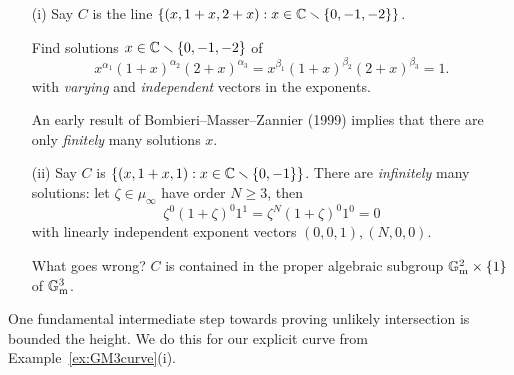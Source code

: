 \begin{example}\label{ex:GM3curve}
  \begin{enumerate}
  \item [(i)]
    Say $C$ is the line $\left\{(x,1+x,2+x) : x\in {\mathbb{C}}\smallsetminus\{0,-1,-2\}\right\}$.
    
    Find solutions  $x\in{\mathbb{C}}\smallsetminus\{0,-1,-2\}$ of 
    \begin{equation*}
      x^{\alpha_1} (1+x)^{\alpha_2} (2+x)^{\alpha_3} =
      x^{\beta_1} (1+x)^{\beta_2} (2+x)^{\beta_3} = 1.
    \end{equation*}
    with \emph{varying} and \emph{independent}  vectors in the
    exponents.

    An early result of Bombieri--Masser--Zannier (1999) implies
    that there are only \emph{finitely} many solutions $x$.

  \item[(ii)] Say $C$ is $\{(x,1+x,1) : x\in {\mathbb{C}}\smallsetminus \{0,-1\}\}$.
    There are \emph{infinitely} many solutions:  let
    $\zeta\in\mu_\infty$ have order $N\ge 3$, then 
    \begin{equation*}
      \zeta^{0} (1+\zeta)^{0} 1^{1} = \zeta^{N} (1+\zeta)^{0} 1^0 = 0
    \end{equation*}
    with linearly independent exponent vectors $(0,0,1),(N,0,0)$.

    What goes wrong? $C$ is contained in the proper algebraic subgroup
    ${\mathbb{G}}_{\mathrm{m}}^2\times \{1\}$ of ${\mathbb{G}}_{\mathrm{m}}^3$. 
  \end{enumerate}
\end{example}  

One fundamental intermediate step towards proving unlikely
intersection is bounded the height. We do this for our explicit curve
from Example~\ref{ex:GM3curve}(i). 

